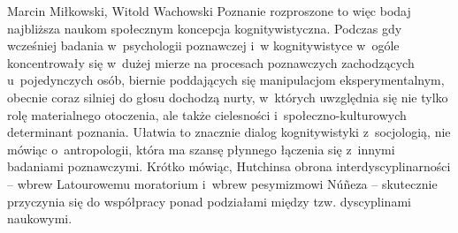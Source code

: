 \begin{artplenv2auth}{Marcin Miłkowski, Witold Wachowski}
Poznanie rozproszone to więc bodaj najbliższa naukom społecznym koncepcja kognitywistyczna. Podczas gdy wcześniej badania w~psychologii poznawczej i~w kognitywistyce w~ogóle koncentrowały się w~dużej mierze na procesach poznawczych zachodzących u~pojedynczych osób, biernie poddających się manipulacjom eksperymentalnym, obecnie coraz silniej do głosu dochodzą nurty, w~których uwzględnia się nie tylko rolę materialnego otoczenia, ale także cielesności i~społeczno-kulturowych determinant poznania. Ułatwia to znacznie dialog kognitywistyki z~socjologią, nie mówiąc o~antropologii, która ma szansę płynnego łączenia się z~innymi badaniami poznawczymi. Krótko mówiąc, Hutchinsa obrona interdyscyplinarności -- wbrew Latourowemu moratorium i~wbrew pesymizmowi Núñeza -- skutecznie przyczynia się do współpracy ponad podziałami między tzw. dyscyplinami naukowymi.

\end{artplenv2auth}